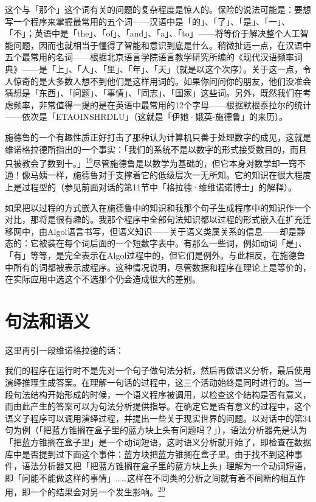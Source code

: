 \documentclass[
  12pt,
  twoside,
  openright,
  oldfontcommands,
]{memoir}
\newenvironment{fsquote}{%
  \begin{mdframed}[style=gebquote]\kaitifamily\small%
}{%
  \end{mdframed}%
}
\begin{document}
这个与「那个」这个词有关的问题的复杂程度是惊人的。保险的说法可能是：要想写一个程序来掌握最常用的五个词------汉语中是「的」、「了」、「是」、「一」、「不」；英语中是「the」、「of」、「and」、「a」、「to」------将等价于解决整个人工智能问题，因而也就相当于懂得了智能和意识到底是什么。稍微扯远一点，在汉语中五个最常用的名词------根据北京语言学院语言教学研究所编的《现代汉语频率词典》------是「上」、「人」、「里」、「年」、「天」（就是以这个次序）。关于这一点，令人惊奇的是大多数人想不到他们是这样用词的。如果你问问你的朋友，他们没准会猜想是「东西」、「问题」、「事情」、「同志」、「国家」这些词。另外，既然我们在考虑频率，非常值得一提的是在英语中最常用的12个字母------根据默根泰拉尔的统计------依次是「ETAOINSHRDLU」（这就是「伊她·娥英-施德鲁」的来历）。

施德鲁的一个有趣性质正好打击了那种认为计算机只善于处理数字的成见，这就是维诺格拉德所指出的一个事实：{「我们的系统不是以数字的形式接受数目的，而且只被教会了数到十。」\hyperref[fn:Chapter18-19]{\textsuperscript{19}}}尽管施德鲁是以数学为基础的，但它本身对数学却一窍不通！像马姨一样，施德鲁对于支撑着它的低级层次一无所知。它的知识在很大程度上是过程型的（参见前面对话的第11节中「格拉德·维维诺诺博士」的解释）。

如果把以过程的方式嵌入在施德鲁中的知识和我那个句子生成程序中的知识作一个对比，那将是很有趣的。我那个程序中全部句法知识都以过程的形式嵌入在扩充迁移网中，由Algol语言书写，但语义知识------关于语义类属关系的信息------却是静态的：它被装在每个词后面的一个短数字表中。有那么一些词，例如动词「是」、「有」等等，是完全表示在Algol过程中的，但它们是例外。与此相反，在施德鲁中所有的词都被表示成程序。这种情况说明，尽管数据和程序在理论上是等价的，在实际应用中选这个不选那个仍会造成很大的差别。

\section{句法和语义}

这里再引一段维诺格拉德的话：

\begin{fsquote}
我们的程序在运行时不是先对一个句子做句法分析，然后再做语义分析，最后使用演绎推理生成答案。在理解一句话的过程中，这三个活动始终是同时进行的。当一段句法结构开始形成的时候，一个语义程序被调用，以检查这个结构是否有意义，而由此产生的答案可以为句法分析提供指导。在确定它是否有意义的过程中，这个语义子程序可以调用演绎过程，并提出一些关于现实世界的问题。以对话中的第34句为例（「把蓝方锥搁在盒子里的蓝方块上头有问题吗？」），语法分析器先是认为「把蓝方锥搁在盒子里」是一个动词短语，这时语义分析就开始了，即检查在数据库中是否提到过下面这个事件：蓝方块把蓝方锥搁在盒子里。由于找不到这种事件，语法分析器又把「把蓝方锥搁在盒子里的蓝方块上头」理解为一个动词短语，即「问能不能做这样的事情」\ldots\ldots 这样在不同类的分析之间就有着不间断的相互作用，即一个的结果会对另一个发生影响。\hyperref[fn:Chapter18-20]{\textsuperscript{20}}
\end{fsquote}
\end{document}
